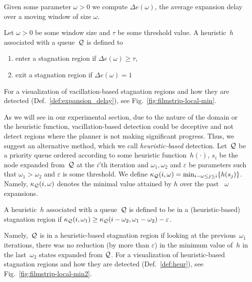 \documentclass{article}
\begin{document}
Given some parameter $\omega >0$ we compute $\Delta e(\omega)$, the average expansion delay over a moving window of size $\omega$. 
\begin{definition}
\label{def:expansion_delay}
Let 
$\omega>0$ be some window size
and
$\tau$ be some threshold value.
A heuristic~$h$ associated with a queue~$\mathcal{Q}$ is defined to
\begin{enumerate}
	\item enter a stagnation region if $\Delta e(\omega) \geq \tau$,
	\item exit a stagnation region if $\Delta e(\omega) = 1$
\end{enumerate}
\end{definition}
For a visualization of vacillation-based stagnation regions and how they are detected (Def.~\ref{def:expansion_delay}), see Fig.~\ref{fig:filmstrip-local-min}.

As we will see in our experimental section, due to the nature of the domain or the heuristic function, vacillation-based detection could be deceptive and not detect regions where the planner is not making significant progress. 
Thus, we suggest an alternative method, which we call \emph{heuristic-based} detection.
Let~$\mathcal{Q}$ be a priority queue 
ordered according to some heuristic function~$h(\cdot)$,
$s_i$ be the node expanded from~$\mathcal{Q}$ at the $i'$th iteration and $\omega_1, \omega_2$ and $\varepsilon$ be parameters such that $\omega_1 > \omega_2$ and $\varepsilon$ is some threshold.
%
We define 
$\kappa_{\mathcal{Q}}(i, \omega) = \min_{i-\omega \leq j \leq i} \{ h(s_j)\}$.
Namely, $\kappa_{\mathcal{Q}}(i, \omega)$ denotes the minimal value attained by $h$ over the past ~$\omega$ expansions. 
%
\begin{definition}
\label{def:heur}
A heuristic~$h$ associated with a queue~$\mathcal{Q}$ is defined to be in a (heuristic-based) stagnation region if 
$\kappa_{\mathcal{Q}}(i, \omega_1) \geq \kappa_{\mathcal{Q}}(i - \omega_2, \omega_1 - \omega_2) - \varepsilon$.
\end{definition}
\noindent Namely,~$\mathcal{Q}$ is in a heuristic-based stagnation region if looking at the previous~$\omega_1$ iterations, 
there was no reduction 
(by more than $\varepsilon$) 
in the minimum value of~$h$ 
in the last~$\omega_2$ states expanded from $\mathcal{Q}$.
%
%
For a visualization of heuristic-based stagnation regions and how they are detected (Def.~\ref{def:heur}), see Fig.~\ref{fig:filmstrip-local-min2}.
\end{document}
